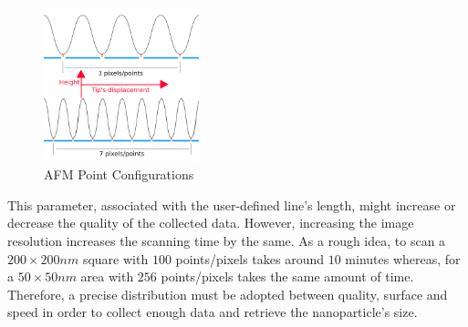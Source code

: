 \documentclass{article}
\numberwithin{equation}{section}
\begin{document}
\begin{figure}[h]
    \centering
    \includegraphics[width=0.4\textwidth, height=0.40\textwidth]{afm_scan_point_config.png}
    \caption{AFM Point Configurations}
    \label{fig:afm_scan_point_config}
\end{figure}
This parameter, associated with the user-defined line's length, might increase or decrease the quality of the collected data. However, increasing the image resolution increases the scanning time by the same. As a rough idea, to scan a $200 \times 200 nm$ square with $100$ points/pixels takes around $10$ minutes whereas, for a $50 \times 50 nm$ area with $256$ points/pixels takes the same amount of time. Therefore, a precise distribution must be adopted between quality, surface and speed in order to collect enough data and retrieve the nanoparticle's size.
\end{document}
